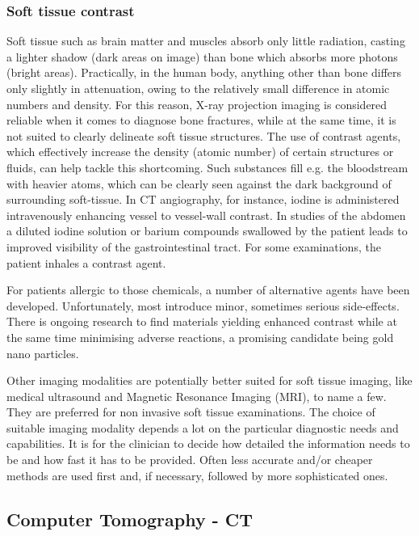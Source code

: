 \subsubsection{Soft tissue contrast}
\label{sec:soft}
Soft tissue such as brain matter and muscles absorb only little radiation, casting a lighter shadow (dark areas on image) than bone which absorbs more photons (bright areas).
Practically, in the human body, anything other than bone differs only slightly in attenuation, owing to the relatively small difference in atomic numbers and density.
For this reason, X-ray projection imaging is considered reliable when it comes to diagnose bone fractures, while at the same time, it is not suited to clearly delineate soft tissue structures.
The use of contrast agents, which effectively increase the density (atomic number) of certain structures or fluids, can help tackle this shortcoming.
Such substances fill e.g. the bloodstream with heavier atoms, which can be clearly seen against the dark background of surrounding soft-tissue.
In CT angiography, for instance, iodine is administered intravenously enhancing vessel to vessel-wall contrast.
In studies of the abdomen a diluted iodine solution or barium compounds swallowed by the patient leads to improved visibility of the gastrointestinal tract.
For some examinations, the patient inhales a contrast agent.

For patients allergic to those chemicals, a number of alternative agents have been developed.
Unfortunately, most introduce minor, sometimes serious side-effects.
There is ongoing research to find materials yielding enhanced contrast while at the same time minimising adverse reactions, a promising candidate being gold nano particles. \cite{Podgorsak, Maidment2014}


Other imaging modalities are potentially better suited for soft tissue imaging, like medical ultrasound and Magnetic Resonance Imaging (MRI), to name a few.
They are preferred for non invasive soft tissue examinations.
The choice of suitable imaging modality depends a lot on the particular diagnostic needs and capabilities.
It is for the clinician to decide how detailed the information needs to be and how fast it has to be provided.
Often less accurate and/or cheaper methods are used first and, if necessary, followed by more sophisticated ones.


\subsection{Computer Tomography - CT}

